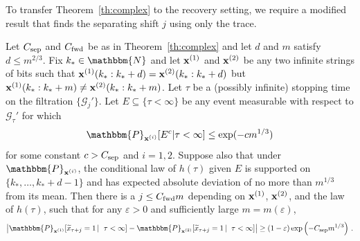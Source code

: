 \documentclass[final,12pt]{colt2018} %
\newcommand{\N}{\mathbbm{N}}
\renewcommand{\P}{\mathbbm{P}}
\newcommand{\eps}{\varepsilon}
\newcommand{\1}{\mathbf{1}}
\def\cG{\mathcal{G}}
\newcommand{\eqb}{\begin{equation}}
\newcommand{\eqe}{\end{equation}}
\newcommand{\wt}{\widetilde}
\def\x{{\bf x}}
\def\ee{\varepsilon}
\def\csep{C_{\rm sep}} %
\def\cfwd{C_{\rm fwd}} %
\begin{document}
To transfer Theorem~\ref{th:complex} to the recovery setting,
we require a modified result that finds the separating shift
$j$ using only the trace.

\begin{corollary}
	\label{cor:tau}
	Let $\csep$ and $\cfwd$ be as in Theorem~\ref{th:complex} and
	let $d$ and $m$ satisfy $d \leq m^{2/3}$.  Fix $k_*\in\N$ and let
	$\x^{(1)}$ and $\x^{(2)}$ be any two infinite strings of bits
	such that $\x^{(1)} (k_* : k_* + d) = \x^{(2)}(k_* : k_* + d)$
	but $\x^{(1)} (k_* : k_* + m) \neq \x^{(2)}(k_* : k_* + m)$.
	Let $\tau$ be a (possibly infinite) stopping time on the
	filtration $\{ \cG_j' \}$.  Let $E \subseteq \{ \tau < \infty \}$
	be any event measurable with respect to $\cG_{\tau}'$ for which
	\eqb \label{eq:discrep}
	\P_{\x^{(i)}} [E^c | \tau < \infty] \leq \exp (-c m^{1/3})
	\eqe
	for some constant $c > \csep$ and $i = 1 , 2$.  Suppose also that under
	$\P_{\x^{(i)}}$, the conditional law of $h(\tau)$ given $E$ is
	supported on $\{ k_* , \ldots , k_* + d-1 \}$ and has expected absolute
	deviation of no more than $m^{1/3}$ from its mean. Then there is a
	$j \leq \cfwd m$  depending on $\x^{(1)}$, $\x^{(2)}$, and the law of $h(\tau)$,
	such that for any $\eps > 0$ and
	sufficiently large $m=m(\ee)$,
	\eqb \label{eq:sep 2}
	\left | \P_{\x^{(1)}} [\wt x_{\tau + j} = 1 \, |^{\phantom L} \tau < \infty] -
	\P_{\x^{(2)}} [\wt x_{\tau + j} = 1 \, |^{\phantom L} \tau < \infty] \right |
	\geq (1-\eps) \exp \left ( - \csep m^{1/3} \right ) \, .
	\eqe
\end{corollary}
\end{document}
